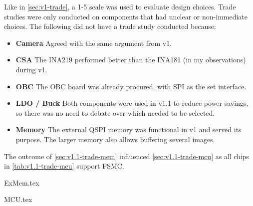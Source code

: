 Like in \autoref{sec:v1-trade}, a 1-5 scale was used to evaluate design choices. Trade studies were only conducted on components that had unclear or non-immediate choices. The following did not have a trade study conducted because:

\begin{itemize}
    \item \textbf{Camera} Agreed with the same argument from v1.
    \item \textbf{CSA} The INA219 performed better than the INA181 (in my observations) during v1.
    \item \textbf{OBC} The OBC board was already procured, with SPI as the set interface.
    \item \textbf{LDO / Buck} Both components were used in v1.1 to reduce power savings, so there was no need to debate over which needed to be selected.
    \item \textbf{Memory} The external QSPI memory was functional in v1 and served its purpose. The larger memory also allows buffering several images.
\end{itemize}

The outcome of \autoref{sec:v1.1-trade-mem} influenced \autoref{sec:v1.1-trade-mcu} as all chips in \autoref{tab:v1.1-trade-mcu} support FSMC.

\label{sec:v1.1-trade-mem}
    {ExMem.tex}

\label{sec:v1.1-trade-mcu}
    {MCU.tex}